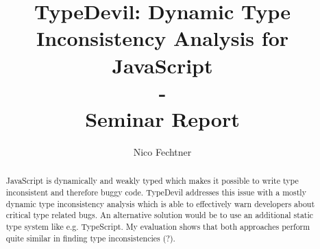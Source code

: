\documentclass[runningheads,a4paper]{llncs}
\newcommand{\keywords}[1]{\par\addvspace\baselineskip

\noindent\keywordname\enspace\ignorespaces#1}
\begin{document}
\mainmatter  %

\title{TypeDevil: Dynamic Type Inconsistency Analysis for JavaScript\\-\\Seminar Report}


\author{Nico Fechtner}
%


%
%

\toctitle{}
\tocauthor{}
\maketitle

\tableofcontents
\newpage

\begin{abstract}
JavaScript is dynamically and weakly typed which makes it possible to write type inconsistent and therefore buggy code. 
TypeDevil addresses this issue with a mostly dynamic type inconsistency analysis which is able to effectively warn developers about critical type related bugs.
An alternative solution would be to use an additional static type system like e.g. TypeScript.
My evaluation shows that both approaches perform quite similar in finding type inconsistencies (?).
\end{abstract}
\end{document}
